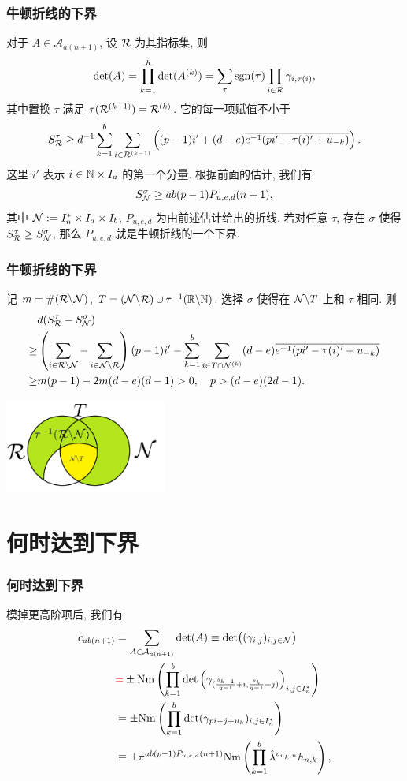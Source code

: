 \documentclass{beamer}
\newcommand\ov{\overline}
\newcommand\CA{{\mathcal{A}}} \newcommand\CB{{\mathcal{B}}} \newcommand\CC{{\mathcal{C}}}\providecommand\CD{{\mathcal{D}}}\newcommand\CE{{\mathcal{E}}}
\newcommand\bs{\backslash}
\newcommand\Nm{{\mathrm{Nm}}}
\newcommand\sgn{{\mathrm{sgn}}}
\begin{document}
\begin{frame}
\frametitle{牛顿折线的下界}
对于 $A\in\CA_{a(n+1)}$, 设 ${\mathcal{R}}$ 为其指标集, 则
	\vspace{-2mm}
	\[\det(A)=\prod_{k=1}^b\det(A^{(k)})=\sum_{\tau}\sgn(\tau)\prod_{i\in\CR}\gamma_{i,\tau(i)},\]
	\vspace{-2mm}
其中置换 $\tau$ 满足 $\tau({\mathcal{R}}^{(k-1)})={\mathcal{R}}^{(k)}$.
它的每一项赋值不小于
	\vspace{-2mm}
		\[S_\CR^\tau\ge d^{-1}\sum_{k=1}^b\sum_{i\in\CR^{(k-1)}}\left((p-1)i'+(d-e)\ov{e^{-1}(pi'-\tau(i)'+u_{-k})}\right).\]
这里 $i'$ 表示 $i\in{\mathbb{N}}\times I_a$ 的第一个分量.
根据前面的估计, 我们有
	\vspace{-2mm}
	\[S_{\mathcal{N}}^\sigma\ge ab(p-1)P_{u,e,d}(n+1),\]
其中 ${\mathcal{N}}:=I_n^*\times I_a\times I_b$, $P_{u,e,d}$ 为由前述估计给出的折线.
若对任意 $\tau$, 存在 $\sigma$ 使得 $S_{\mathcal{R}}^\tau\ge S_{\mathcal{N}}^\sigma$, 那么 $P_{u,e,d}$ 就是牛顿折线的一个下界.
\end{frame}

\begin{frame}
\frametitle{牛顿折线的下界}
记 $m=\#(\CR\bs \CN)$, $T=(\CN\bs \CR)\cup\tau^{-1}(\BR\bs \BN)$.
选择 $\sigma$ 使得在 $\CN\bs T$ 上和 $\tau$ 相同. 则
	\[\begin{split}
&d(S_\CR^\tau-S_\CN^\sigma)\\
\ge&\left(\sum_{i\in \CR\bs\CN}-\sum_{i\in\CN\bs\CR}\right)(p-1)i'-\sum_{k=1}^b\sum_{i\in T\cap\CN^{(k)}}(d-e)\ov{e^{-1}(pi'-\tau(i)'+u_{-k})}\\
\ge&m(p-1)-2m(d-e)(d-1)>0,\quad p> (d-e)(2d-1).
\end{split}\]
\begin{center}
\includegraphics[width=0.4\textwidth]{2021qingdao.png}
\end{center}
\end{frame}

\section{何时达到下界}

\begin{frame}
\frametitle{何时达到下界}
模掉更高阶项后, 我们有
	\[\begin{split}
	c_{ab(n+1)}&=\sum_{A\in\CA_{a(n+1)}}\det(A)\equiv \det\bigl((\gamma_{i,j})_{i,j\in \CN}\bigr)\\
	&{\color{red}{=}}\pm\Nm\left(\prod_{k=1}^b\det\left(\gamma_{(\frac{s_{k-1}}{q-1}+i,\frac{s_k}{q-1}+j)}\right)_{i,j\in I_n^*}\right)\\
	&=\pm \Nm\left(\prod_{k=1}^b\det(\gamma_{pi-j+u_k})_{i,j\in I_n^*}\right)\\
	&\equiv\pm\pi^{ab(p-1)P_{u,e,d}(n+1)}\Nm\left(\prod_{k=1}^b \hat\lambda^{v_{u_k,n}} h_{n,k}\right),
	\end{split}\]
\end{frame}
\end{document}
